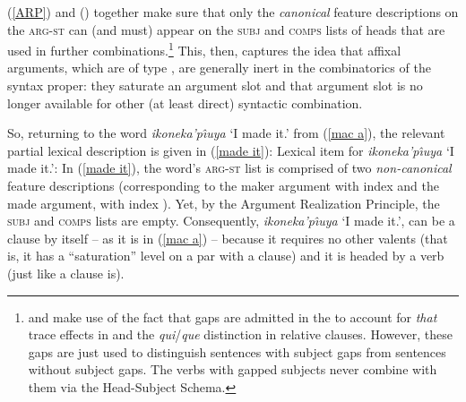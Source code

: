 \documentclass[output=paper
 	        ,biblatex
                ,babelshorthands
                ,newtxmath
                ,draftmode
                ,colorlinks, citecolor=brown
]{langscibook}
\begin{document}
(\ref{ARP}) and () together make sure that only the \textit{canonical} feature descriptions
on the \textsc{arg-st} can (and must) appear on the \textsc{subj} and \textsc{comps} lists of heads
that are used in further combinations.\footnote{
\citet[Section~5.1.3]{GSag2000a-u}  and \citet[]{AG2007a-u} make use of the fact that
gaps are admitted in the \subjl to account for \emph{that} trace effects in  and the \emph{qui}/\emph{que}
distinction in  relative clauses. However, these gaps are just used to distinguish
sentences with subject gaps from sentences without subject gaps. The verbs with gapped subjects
never combine with them via the Head-Subject Schema.
} %
This, then, captures the idea that affixal arguments, which are of type , are generally inert in the combinatorics of the syntax proper: they saturate an argument slot and that argument slot is no longer available for other (at least direct) syntactic combination. 

So, returning to the  word \textit{ikoneka'p\^{\i}uya} `I made it.' from (\ref{mac a}),
the relevant partial lexical description is given in (\ref{made it}):
% 
\ea
\label{made it}
Lexical item for \emph{ikoneka'p\^{\i}uya} `I made it.':
\z
%
In (\ref{made it}), the word's \textsc{arg-st} list is comprised of two \textit{non-canonical} feature descriptions (corresponding to the maker argument with index  and the made argument, with index ). Yet, by the Argument Realization Principle, the \textsc{subj} and \textsc{comps} lists are empty. Consequently, \textit{ikoneka'p\^{\i}uya} `I made it.', can be a clause by itself -- as it is in (\ref{mac a}) -- because it requires no other valents (that is, it has a ``saturation'' level on a par with a clause) and it is headed by a verb (just like a clause is). 
\end{document}
